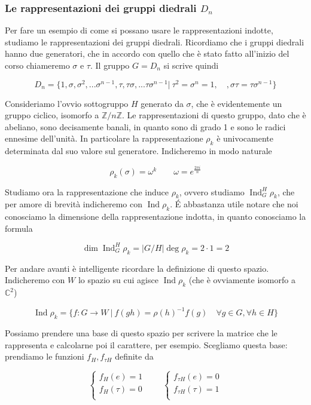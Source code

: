 \documentclass[11pt]{article}
\theoremstyle{plain}
\theoremstyle{definition}
\theoremstyle{remark}
\newcommand{\C}{\mathbb{C}}
\newcommand{\Z}{\mathbb{Z}}
\DeclareMathOperator{\Ind}{Ind}
\begin{document}
\subsubsection{Le rappresentazioni dei gruppi diedrali $D_{n}$}
Per fare un esempio di come si possano usare le rappresentazioni indotte, studiamo le rappresentazioni dei gruppi diedrali. Ricordiamo che i gruppi diedrali hanno due generatori, che in accordo con quello che è stato fatto all'inizio del corso chiameremo $\sigma$ e $\tau$. Il gruppo $G = D_{n}$ si scrive quindi

\[ D_{n} = \{ 1, \sigma, \sigma^2, ... \sigma^{n-1}, \tau, \tau\sigma, ... \tau\sigma^{n-1} | \ \tau^2 = \sigma^n = 1, \quad, \sigma\tau = \tau\sigma^{n-1} \}\]


Consideriamo l'ovvio sottogruppo $H$ generato da $\sigma$, che è evidentemente un gruppo ciclico, isomorfo a $\Z / n \Z$. Le rappresentazioni di questo gruppo, dato che è abeliano, sono decisamente banali, in quanto sono di grado 1 e sono le radici ennesime dell'unità. In particolare la rappresentazione $\rho_k$ è univocamente determinata dal suo valore sul generatore. Indicheremo in modo naturale

\[\rho_k(\sigma) = \omega^k  \qquad \omega = e^{\frac{2\pi i}{n}}\]


Studiamo ora la rappresentazione che induce $\rho_k$, ovvero studiamo $\Ind_G^H \rho_k$, che per amore di brevità indicheremo con $\Ind \rho_k$. \'E abbastanza utile notare che noi conosciamo la dimensione della rappresentazione indotta, in quanto conosciamo la formula

\[ \dim \Ind^H_G \rho_k = |G/H| \deg \rho_k = 2 \cdot 1 = 2\]

Per andare avanti è intelligente ricordare la definizione di questo spazio. Indicheremo con $W$ lo spazio su cui agisce $\Ind \rho_k$ (che è ovviamente isomorfo a $\C^2$)


\[ \Ind \rho_k = \{ f : G \to W\ |\ f(gh) = \rho(h)^{-1} f(g) \quad \forall g \in G, \forall h \in H \}\]

Possiamo prendere una base di questo spazio per scrivere la matrice che le rappresenta e calcolarne poi il carattere, per esempio. Scegliamo questa base: prendiamo le funzioni $f_H, f_{\tau H}$ definite da

\[
\begin{cases}
f_H (e) = 1 \\
f_H (\tau) = 0 \\
\end{cases}
\qquad
\begin{cases}
f_{\tau H} (e) = 0 \\
f_{\tau H } (\tau) = 1 \\
\end{cases}
\]
\end{document}
